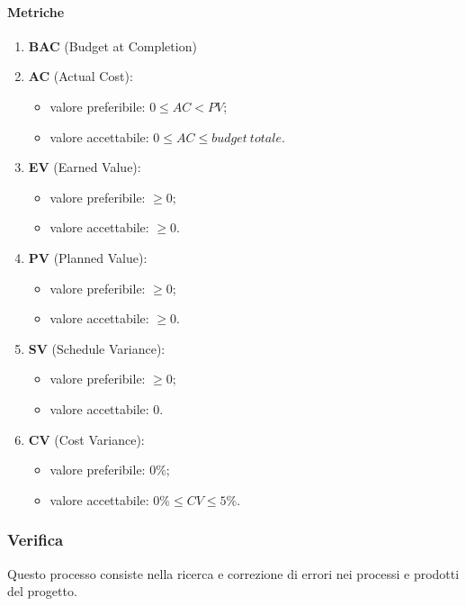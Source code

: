         \paragraph{Metriche}
            \begin{enumerate}
                \item \textbf{BAC} (Budget at Completion)
                \item \textbf{AC} (Actual Cost):
                \begin{itemize}
                    \item valore preferibile: $0 \leq AC < PV$;
                    \item valore accettabile: $0 \leq AC \leq budget\ totale$.
                \end{itemize}
                \item \textbf{EV} (Earned Value):
                \begin{itemize}
                    \item valore preferibile: $\geq 0$;
                    \item valore accettabile: $\geq 0$.
                \end{itemize}
                \item \textbf{PV} (Planned Value):
                \begin{itemize}
                    \item valore preferibile: $\geq 0$;
                    \item valore accettabile: $\geq 0$.
                \end{itemize}
                \item \textbf{SV} (Schedule Variance):
                \begin{itemize}
                    \item valore preferibile: $\geq 0$;
                    \item valore accettabile: $0$.
                \end{itemize}
                \item \textbf{CV} (Cost Variance):
                \begin{itemize}
                    \item valore preferibile: $0\%$;
                    \item valore accettabile: $0\% \leq CV \leq 5\%$.
                \end{itemize}
            \end{enumerate}
    \subsubsection{Verifica}
        Questo processo consiste nella ricerca e correzione di errori nei processi e prodotti del progetto.
